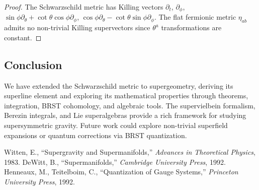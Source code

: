 \documentclass{article}
\theoremstyle{plain}
\begin{document}
\begin{proof}
The Schwarzschild metric has Killing vectors $\partial_{t}$,
$\partial_{\phi}$, $\sin\phi \partial_{\theta} + \cot\theta \cos\phi \partial_{\phi}$,
$\cos\phi \partial_{\theta} - \cot\theta \sin\phi \partial_{\phi}$.
The flat fermionic metric $\eta_{ab}$ admits no non-trivial Killing
supervectors since $\theta^{a}$ transformations are constant.
\end{proof}

\subsection{Conclusion}

We have extended the Schwarzschild metric to supergeometry, deriving its superline element and exploring its mathematical properties through theorems, integration, BRST cohomology, and algebraic tools. The supervielbein formalism, Berezin integrals, and Lie superalgebras provide a rich framework for studying supersymmetric gravity. Future work could explore non-trivial superfield expansions or quantum corrections via BRST quantization.

\begin{thebibliography}{9}
  Witten, E., ``Supergravity and Supermanifolds,'' \emph{Advances in Theoretical Physics}, 1983.
  DeWitt, B., ``Supermanifolds,'' \emph{Cambridge University Press}, 1992.
  Henneaux, M., Teitelboim, C., ``Quantization of Gauge Systems,'' \emph{Princeton University Press}, 1992.
\end{thebibliography}
\end{document}
